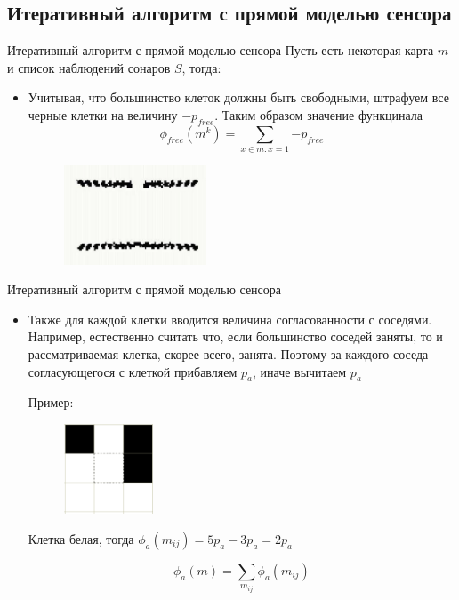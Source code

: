 \documentclass[9pt]{beamer}
\begin{document}
\subsection{Итеративный алгоритм с прямой моделью сенсора}

\begin{frame}{Итеративный алгоритм с прямой моделью сенсора}
Пусть есть некоторая карта $m$ и список наблюдений сонаров $S$, тогда:
\begin{itemize}
  \item
  {
    Учитывая, что большинство клеток должны быть свободными, штрафуем все черные клетки на величину $-p_{free}$. Таким образом значение функцинала $$\phi_{free}(m^{k}) = \sum_{x \in m: x=1}{-p_{free}}$$
  }
  \begin{figure}[h]
    \centering
    \includegraphics[width=0.4\textwidth]{map_ex.png}
  \end{figure}

\end{itemize}
\end{frame}

\begin{frame}{Итеративный алгоритм с прямой моделью сенсора}
\begin{itemize}
  \item
  {
    Также для каждой клетки вводится величина согласованности с соседями. Например, естественно считать что, если большинство соседей заняты, то и рассматриваемая клетка, скорее всего, занята. Поэтому за каждого соседа согласующегося с клеткой прибавляем $p_{a}$, иначе вычитаем $p_a$

    Пример:

    \begin{figure}[h]
      \centering
      \includegraphics[width=0.25\textwidth]{cells.png}
    \end{figure}

    Клетка белая, тогда $\phi_a(m_{ij}) = 5p_a - 3p_a = 2p_a$

    $$\phi_a(m) = \sum_{m_{ij}} \phi_a(m_{ij})$$
  }

\end{itemize}

\end{frame}
\end{document}
